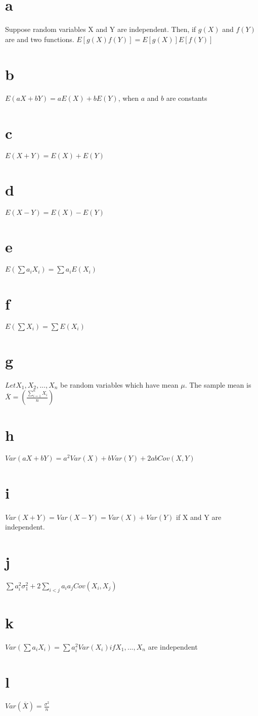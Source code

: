 \documentclass[12pt]{article}
\begin{document}
\begin{itemize}
\part{a} Suppose random variables X and Y are independent. Then, if $g(X)$ and $f(Y)$ are and two functions. $E[g(X)f(Y)]=E[g(X)]E[f(Y)]$
\part{b} $E(aX+bY)=aE(X)+bE(Y)$, when $a$ and $b$ are constants
\part{c} $E(X+Y)=E(X)+E(Y)$
\part{d} $E(X-Y)=E(X)-E(Y)$ 
\part{e} $E( \sum a_iX_i) = \sum a_i E(X_i)$
\part{f} $E( \sum X_i) = \sum E(X_i)$
\part{g} $Let X_1, X_2,..., X_n$ be random variables which have mean $\mu$. The sample mean is $\overline{X}=(\frac{\sum_{i=1}^n X_i}{n})$
\part{h} $Var(aX+bY)=a^2Var(X)+bVar(Y)+2abCov(X,Y)$
\part{i} $Var(X+Y)=Var(X-Y)=Var(X)+Var(Y)$ if X and Y are independent.
\part{j} $\sum a_i^2\sigma_1^2+2\sum_{i<j} a_ia_jCov(X_i, X_j)$
\part{k} $Var(\sum a_iX_i)=\sum a_i^2Var(X_i) if X_1,...,X_n$ are independent
\part{l} $Var(\overline{X})=\frac{\sigma^2}{n}$
\end{itemize}
\end{document}

